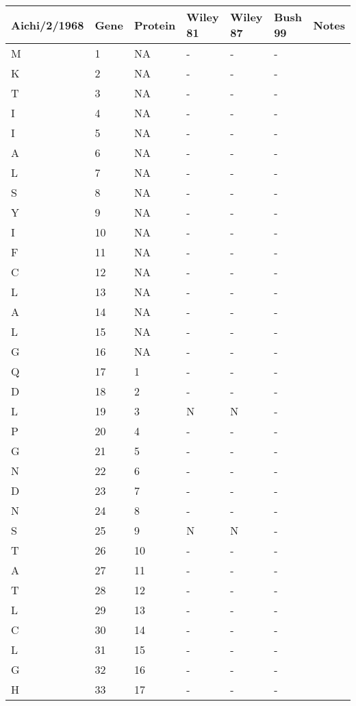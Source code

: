 \documentclass[10pt]{article}
\begin{document}
\small
\begin{longtable}{lllllll}
  \hline
Aichi/2/1968 & Gene & Protein & Wiley 81 & Wiley 87 & Bush 99 & Notes \\ \hline
  M &   1 & NA & - & - & - &  \\ 
  K &   2 & NA & - & - & - &  \\ 
  T &   3 & NA & - & - & - &  \\ 
  I &   4 & NA & - & - & - &  \\ 
  I &   5 & NA & - & - & - &  \\ 
  A &   6 & NA & - & - & - &  \\ 
  L &   7 & NA & - & - & - &  \\ 
  S &   8 & NA & - & - & - &  \\ 
  Y &   9 & NA & - & - & - &  \\ 
  I &  10 & NA & - & - & - &  \\ 
  F &  11 & NA & - & - & - &  \\ 
  C &  12 & NA & - & - & - &  \\ 
  L &  13 & NA & - & - & - &  \\ 
  A &  14 & NA & - & - & - &  \\ 
  L &  15 & NA & - & - & - &  \\ 
  G &  16 & NA & - & - & - &  \\ 
  Q &  17 & 1 & - & - & - &  \\ 
  D &  18 & 2 & - & - & - &  \\ 
  L &  19 & 3 & N & N & - &  \\ 
  P &  20 & 4 & - & - & - &  \\ 
  G &  21 & 5 & - & - & - &  \\ 
  N &  22 & 6 & - & - & - &  \\ 
  D &  23 & 7 & - & - & - &  \\ 
  N &  24 & 8 & - & - & - &  \\ 
  S &  25 & 9 & N & N & - &  \\ 
  T &  26 & 10 & - & - & - &  \\ 
  A &  27 & 11 & - & - & - &  \\ 
  T &  28 & 12 & - & - & - &  \\ 
  L &  29 & 13 & - & - & - &  \\ 
  C &  30 & 14 & - & - & - &  \\ 
  L &  31 & 15 & - & - & - &  \\ 
  G &  32 & 16 & - & - & - &  \\ 
  H &  33 & 17 & - & - & - &  \\ 

\end{longtable}
\end{document}
